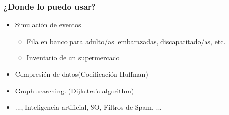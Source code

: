 \documentclass{beamer}
\begin{document}
    \begin{frame}
        \frametitle{¿Donde lo puedo usar?}
        \begin{itemize}
            \item Simulación de eventos
            \begin{itemize}
                \item Fila en banco para adulto/as, embarazadas, discapacitado/as, etc.
                \item Inventario de un supermercado
            \end{itemize}

            \item Compresión de datos(Codificación Huffman)

            \item Graph searching. (Dijkstra's algorithm)

            \item ..., Inteligencia artificial, SO, Filtros de Spam, ...

        \end{itemize}
        \begin{center}
        \end{center}
    \end{frame}
\end{document}
